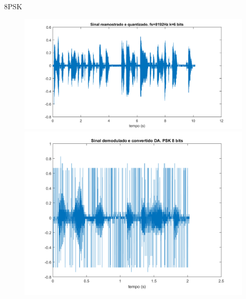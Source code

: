 ﻿\documentclass[mathserif]{beamer}
\begin{document}
	\begin{frame}{8PSK}
		\begin{figure}
			\centering
			\includegraphics[scale=0.3]{../NossoCodigo2/figuras/0quantizado.png}
			\quad
			\includegraphics[scale=0.3]{../NossoCodigo2/figuras/modula15.png}
		\end{figure}
	\end{frame}
\end{document}
